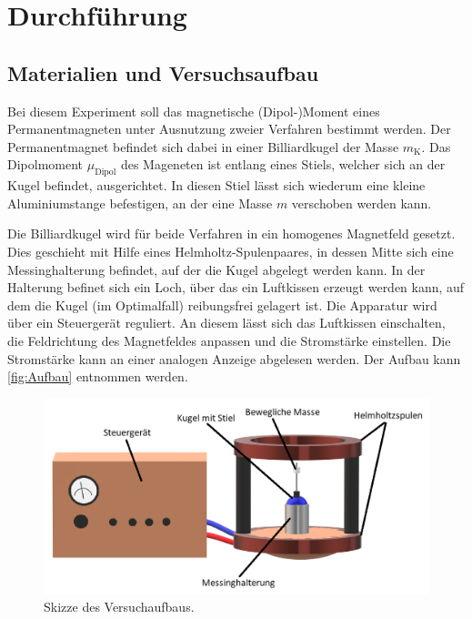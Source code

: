 \section{Durchführung}
\label{sec:Durchführung}

\subsection{Materialien und Versuchsaufbau}
Bei diesem Experiment soll das magnetische (Dipol-)Moment eines Permanentmagneten unter Ausnutzung zweier Verfahren bestimmt werden.
Der Permanentmagnet befindet sich dabei in einer Billiardkugel der Masse $m_{\text{K}}$. Das Dipolmoment $\mu_{\text{Dipol}}$ des Mageneten ist entlang eines Stiels,
welcher sich an der Kugel befindet, ausgerichtet. In diesen Stiel lässt sich wiederum eine kleine Aluminiumstange befestigen, an der eine Masse $m$ verschoben werden kann.


Die Billiardkugel wird für beide Verfahren in ein homogenes Magnetfeld gesetzt. Dies geschieht mit Hilfe eines Helmholtz-Spulenpaares, in dessen Mitte sich eine
Messinghalterung befindet, auf der die Kugel abgelegt werden kann. In der Halterung befinet sich ein Loch, über das ein \glqq Luftkissen\grqq \: erzeugt werden kann, auf dem
die Kugel (im Optimalfall) reibungsfrei gelagert ist. Die Apparatur wird über ein Steuergerät reguliert. An diesem lässt sich das Luftkissen einschalten, die Feldrichtung
des Magnetfeldes anpassen und die Stromstärke einstellen. Die Stromstärke kann an einer analogen Anzeige abgelesen werden. Der Aufbau kann \autoref{fig:Aufbau} entnommen werden.

\begin{figure}
    \centering
    \includegraphics[width=\textwidth]{content/AufbauSkizze.png}
	\caption{Skizze des Versuchaufbaus. \cite{paint3d}}
	\label{fig:Aufbau}
\end{figure}


